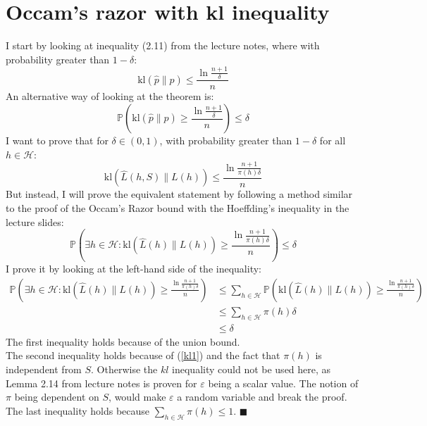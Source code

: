 \documentclass[a4paper]{article}
\newcommand*{\QEDA}{\hfill\ensuremath{\blacksquare}}%
\begin{document}
\section{Occam’s razor with kl inequality}
I start by looking at inequality (2.11) from the lecture notes, where with
probability greater than $1-\delta$:
$$
\mathrm{kl}(\hat{p} \| p) \leq \frac{\ln \frac{n+1}{\delta}}{n}
$$
An alternative way of looking at the theorem is:
\begin{equation}\label{kl1}
\mathbb{P}(
\mathrm{kl}(\hat{p} \| p) \geq \frac{\ln \frac{n+1}{\delta}}{n}
) \leq \delta \tag{1}
\end{equation}
I want to prove that for $\delta \in(0,1)$, with probability greater than
$1-\delta$ for all $h \in \mathcal{H}$:
$$
\mathrm{kl}(\hat{L}(h, S) \| L(h)) \leq \frac{\ln \frac{n+1}{\pi(h) \delta}}{n}
$$
But instead, I will prove the equivalent statement by following a method similar
to the proof of the Occam's Razor bound with the Hoeffding's inequality in the
lecture slides:
$$
  \mathbb{P}(\exists h \in \mathcal{H} :
  \mathrm{kl}(\hat{L}(h) \| L(h)) \geq \frac{\ln \frac{n+1}{\pi(h)\delta}}{n})
  \leq \delta
$$
I prove it by looking at the left-hand side of the inequality:
\begin{align*}
  \mathbb{P}(\exists h \in \mathcal{H} :
  \mathrm{kl}(\hat{L}(h) \| L(h)) \geq \frac{\ln \frac{n+1}{\pi(h)\delta}}{n})
  &\leq
  \sum_{h \in \mathcal{H}}
  \mathbb{P} (\mathrm{kl}(\hat{L}(h) \| L(h)) \geq \frac{\ln \frac{n+1}{\pi(h)\delta}}{n})\\
  &\leq
  \sum_{h \in \mathcal{H}}\pi(h)\delta \\
  &\leq
  \delta
\end{align*}
The first inequality holds because of the union bound.\\
The second inequality holds because of (\ref{kl1}) and the fact that $\pi(h)$ is
independent from $S$. Otherwise the $kl$ inequality could not be used here, as Lemma 2.14
from lecture notes is proven for $\varepsilon$ being a scalar value. The
notion of $\pi$ being dependent on $S$, would make $\varepsilon$ a random
variable and break the proof.\\
The last inequality holds because
$\sum_{h \in \mathcal{H}} \pi(h) \leq 1$. \QEDA
\end{document}
